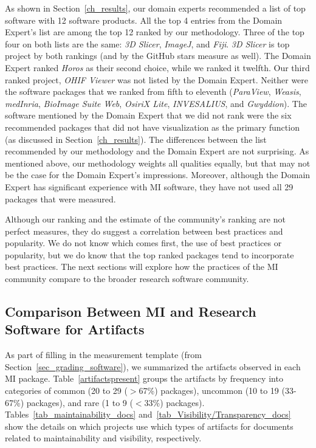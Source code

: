 \documentclass[11pt]{article}
\begin{document}
As shown in Section~\ref{ch_results}, our domain experts recommended
a list of top software with 12 software products.  All the top 4 entries from
the Domain Expert's list are among the top 12 ranked by our methodology. Three
of the top four on both lists are the same: \textit{3D Slicer}, \textit{ImageJ},
and \textit{Fiji}. \textit{3D Slicer} is top project by both rankings (and by
the GitHub stars measure as well).  The Domain Expert ranked \textit{Horos} as
their second choice, while we ranked it twelfth.  Our third ranked project,
\textit{OHIF Viewer} was not listed by the Domain Expert.  Neither were the
software packages that we ranked from fifth to eleventh (\textit{ParaView},
\textit{Weasis}, \textit{medInria}, \textit{BioImage Suite Web}, \textit{OsiriX
Lite}, \textit{INVESALIUS}, and \textit{Gwyddion}).  The software mentioned by
the Domain Expert that we did not rank were the six recommended packages that
did not have visualization as the primary function (as discussed in
Section~\ref{ch_results}).  The differences between the list
recommended by our methodology and the Domain Expert are not surprising.  As
mentioned above, our methodology weights all qualities equally, but that may not
be the case for the Domain Expert's impressions.  Moreover, although the Domain
Expert has significant experience with MI software, they have not used all 29
packages that were measured.

Although our ranking and the estimate of the community's ranking are not perfect
measures, they do suggest a correlation between best practices and popularity.
We do not know which comes first, the use of best practices or popularity, but
we do know that the top ranked packages tend to incorporate best practices. The
next sections will explore how the practices of the MI community compare to the
broader research software community.

\subsection{Comparison Between MI and Research Software for Artifacts}
\label{Sec_CompareArtifacts}

As part of filling in the measurement template (from
Section~\ref{sec_grading_software}), we summarized the artifacts observed in
each MI package. Table~\ref{artifactspresent} groups the artifacts by frequency
into categories of common (20 to 29 ($>$67\%) packages), uncommon (10 to 19
(33-67\%) packages), and rare (1 to 9 ($<$33\%) packages).
Tables~\ref{tab_maintainability_docs} and~\ref{tab_Visibility/Transparency_docs}
show the details on which projects use which types of artifacts for documents
related to maintainability and visibility, respectively.
\end{document}
